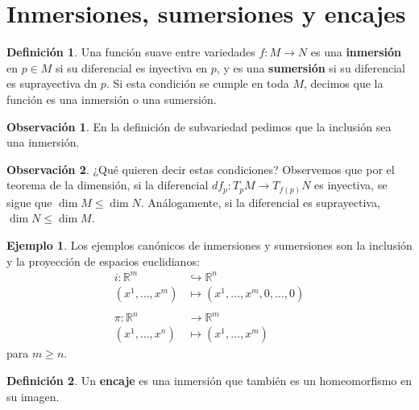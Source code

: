 \documentclass[spanish]{book}
\theoremstyle{definition}
\newtheorem*{defn}{Definición}
\newtheorem*{obs}{Observación}
\newtheorem*{ejem}{Ejemplo}
\newcommand{\R}{\mathbb{R}}
\begin{document}
	\section{Inmersiones, sumersiones y encajes}
	\begin{defn}
		Una función suave entre variedades $f:M\to N$ es una \textbf{inmersión} en $p\in M$ si su diferencial es inyectiva en $p$, y es una \textbf{sumersión} si su diferencial es suprayectiva dn $p$. Si esta condición se cumple en toda $M$, decimos que la función es una inmersión o una sumersión.
	\end{defn}
	\begin{obs}
		En la definición de subvariedad pedimos que la inclusión sea una inmersión.
	\end{obs}
	\begin{obs}
		¿Qué quieren decir estas condiciones? Observemos que por el teorema de la dimensión, si la diferencial $df_p:T_pM\to T_{f(p)}N$ es inyectiva, se sigue que $\dim M\leq\dim N$. Análogamente, si la diferencial es suprayectiva, $\dim N\leq\dim M$.
	\end{obs}
	\begin{ejem}
		Los ejemplos canónicos de inmersiones y sumersiones son la inclusión y la proyección de espacios euclidianos:
		\begin{align*}
			i:\R^m&\hookrightarrow\R^n\\
			(x^1,\ldots,x^m)&\mapsto(x^1,\ldots,x^m,0,\ldots,0)
			\\\\
			\pi:\R^n&\to\R^m\\
			(x^1,\ldots,x^n)&\mapsto(x^1,\ldots,x^m)
		\end{align*}
		para $m\geq n$.
	\end{ejem}
	\begin{defn}
		Un \textbf{encaje} es una inmersión que también es un homeomorfismo en su imagen.
	\end{defn}
\end{document}
